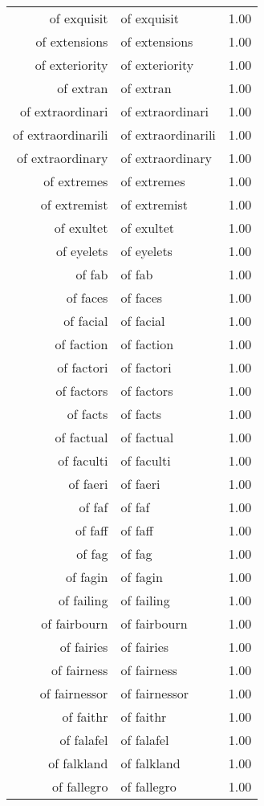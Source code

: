 \begin{table}[ht]
\begin{tabular}{rlr}
  of exquisit & of exquisit & 1.00 \\ 
  of extensions & of extensions & 1.00 \\ 
  of exteriority & of exteriority & 1.00 \\ 
  of extran & of extran & 1.00 \\ 
  of extraordinari & of extraordinari & 1.00 \\ 
  of extraordinarili & of extraordinarili & 1.00 \\ 
  of extraordinary & of extraordinary & 1.00 \\ 
  of extremes & of extremes & 1.00 \\ 
  of extremist & of extremist & 1.00 \\ 
  of exultet & of exultet & 1.00 \\ 
  of eyelets & of eyelets & 1.00 \\ 
  of fab & of fab & 1.00 \\ 
  of faces & of faces & 1.00 \\ 
  of facial & of facial & 1.00 \\ 
  of faction & of faction & 1.00 \\ 
  of factori & of factori & 1.00 \\ 
  of factors & of factors & 1.00 \\ 
  of facts & of facts & 1.00 \\ 
  of factual & of factual & 1.00 \\ 
  of faculti & of faculti & 1.00 \\ 
  of faeri & of faeri & 1.00 \\ 
  of faf & of faf & 1.00 \\ 
  of faff & of faff & 1.00 \\ 
  of fag & of fag & 1.00 \\ 
  of fagin & of fagin & 1.00 \\ 
  of failing & of failing & 1.00 \\ 
  of fairbourn & of fairbourn & 1.00 \\ 
  of fairies & of fairies & 1.00 \\ 
  of fairness & of fairness & 1.00 \\ 
  of fairnessor & of fairnessor & 1.00 \\ 
  of faithr & of faithr & 1.00 \\ 
  of falafel & of falafel & 1.00 \\ 
  of falkland & of falkland & 1.00 \\ 
  of fallegro & of fallegro & 1.00 \\ 

\end{tabular}
\end{table}
